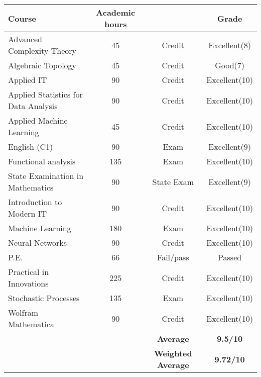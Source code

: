 \documentclass[11pt, a4paper]{report}
\begin{document}
\begin{tabular}{|p{6cm}|c|c|c|}
	\hline
	\rowcolor{LightCyan}
	\textbf{Course}&\textbf{Academic hours}&&\textbf{Grade}\\
	\hline
	Advanced Complexity Theory & 45 & Credit & Excellent(8)\\
	Algebraic Topology & 45 & Credit & Good(7)\\
	Applied IT & 90 & Credit & Excellent(10)\\ 
	Applied Statistics for Data Analysis & 90 & Credit & Excellent(10)\\
	Applied Machine Learning & 45 & Credit & Excellent(10)\\
	English (C1) & 90 & Exam & Excellent(9)\\
	Functional analysis & 135 & Exam & Excellent(10)\\
	State Examination in Mathematics & 90 & State Exam & Excellent(9)\\
	Introduction to Modern IT & 90 & Credit & Excellent(10)\\
	Machine Learning & 180 & Exam & Excellent(10)\\
	Neural Networks & 90 & Credit & Excellent(10)\\
	P.E. & 66 & Fail/pass & Passed \\
	Practical in Innovations  & 225 & Credit & Excellent(10)\\
	Stochastic Processes & 135 & Exam & Excellent(10)\\
  Wolfram Mathematica & 90 & Credit & Excellent(10)\\
	\hline
	\rowcolor{LightCyan}
	&& \textbf{Average} & \textbf{9.5/10}\\
	\rowcolor{LightCyan}
	\hline
	&& \textbf{Weighted Average} & \textbf{9.72/10}\\
	\hline
\end{tabular}\\ \\
\end{document}
